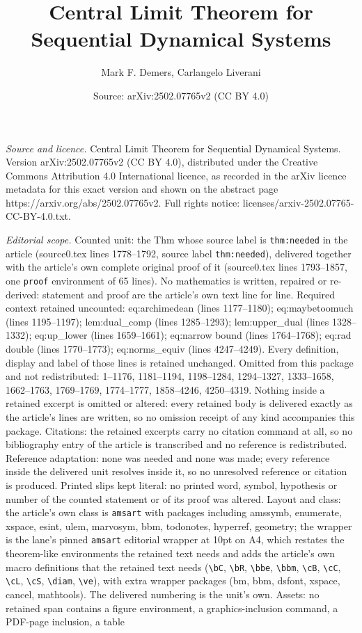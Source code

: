 \documentclass[10pt,a4paper]{amsart}
\title[Central Limit Theorem for Sequential Dynamical Systems]{Central Limit Theorem for Sequential Dynamical Systems}
\author{Mark F. Demers, Carlangelo Liverani}
\date{Source: arXiv:2502.07765v2 (CC BY 4.0)}
\begin{document}
\maketitle

\noindent\emph{Source and licence.} Central Limit Theorem for Sequential Dynamical Systems. Version arXiv:2502.07765v2 (CC BY 4.0), distributed under the Creative Commons Attribution 4.0 International licence, as recorded in the arXiv licence metadata for this exact version and shown on the abstract page https://arxiv.org/abs/2502.07765v2. Full rights notice: licenses/arxiv-2502.07765-CC-BY-4.0.txt.\par\smallskip

\noindent\textit{Editorial scope.} Counted unit: the Thm whose source label is \texttt{thm:needed} in the article (source0.tex lines 1778--1792, source label \texttt{thm:needed}), delivered together with the article's own complete original proof of it (source0.tex lines 1793--1857, one \texttt{proof} environment of 65 lines). No mathematics is written, repaired or re-derived: statement and proof are the article's own text line for line. Required context retained uncounted: eq:archimedean (lines 1177--1180); eq:maybetoomuch (lines 1195--1197); lem:dual\_comp (lines 1285--1293); lem:upper\_dual (lines 1328--1332); eq:up\_lower (lines 1659--1661); eq:narrow bound (lines 1764--1768); eq:rad double (lines 1770--1773); eq:norms\_equiv (lines 4247--4249). Every definition, display and label of those lines is retained unchanged. Omitted from this package and not redistributed: 1--1176, 1181--1194, 1198--1284, 1294--1327, 1333--1658, 1662--1763, 1769--1769, 1774--1777, 1858--4246, 4250--4319. Nothing inside a retained excerpt is omitted or altered: every retained body is delivered exactly as the article's lines are written, so no omission receipt of any kind accompanies this package. Citations: the retained excerpts carry no citation command at all, so no bibliography entry of the article is transcribed and no reference is redistributed. Reference adaptation: none was needed and none was made; every reference inside the delivered unit resolves inside it, so no unresolved reference or citation is produced. Printed slips kept literal: no printed word, symbol, hypothesis or number of the counted statement or of its proof was altered. Layout and class: the article's own class is \texttt{amsart} with packages including amssymb, enumerate, xspace, esint, ulem, marvosym, bbm, todonotes, hyperref, geometry; the wrapper is the lane's pinned \texttt{amsart} editorial wrapper at 10pt on A4, which restates the theorem-like environments the retained text needs and adds the article's own macro definitions that the retained text needs (\texttt{\textbackslash bC}, \texttt{\textbackslash bR}, \texttt{\textbackslash bbe}, \texttt{\textbackslash bbm}, \texttt{\textbackslash cB}, \texttt{\textbackslash cC}, \texttt{\textbackslash cL}, \texttt{\textbackslash cS}, \texttt{\textbackslash diam}, \texttt{\textbackslash ve}), with extra wrapper packages (bm, bbm, dsfont, xspace, cancel, mathtools). The delivered numbering is the unit's own. Assets: no retained span contains a figure environment, a graphics-inclusion command, a PDF-page inclusion, a table 
\end{document}

